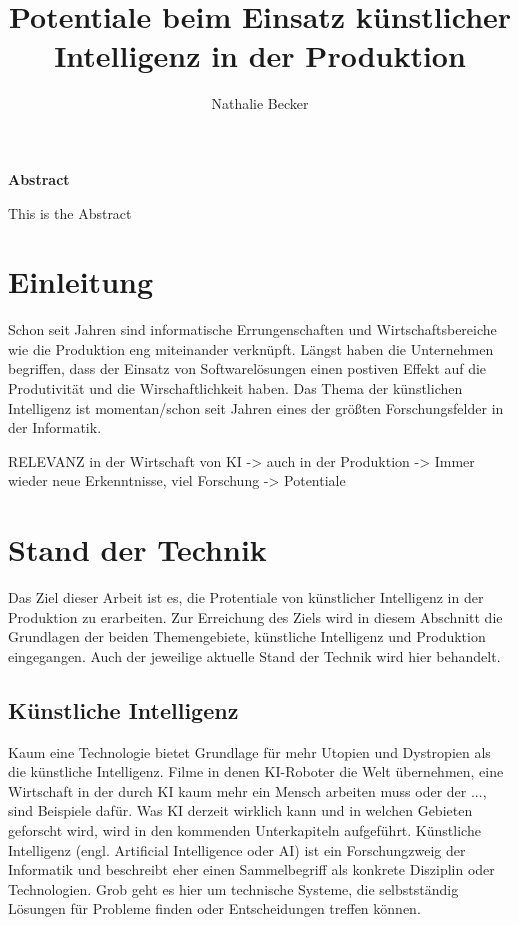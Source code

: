 \documentclass[a4paper,12pt, german]{report}
\begin{document}
\title{Potentiale beim Einsatz künstlicher Intelligenz in der Produktion}
\author{Nathalie Becker}


\begin{titlepage}
\maketitle
\end{titlepage}


\begin{center}
\textbf{Abstract}
\end{center}
This is the Abstract


\tableofcontents
\printacronyms

\chapter{Einleitung}

Schon seit Jahren sind informatische Errungenschaften und Wirtschaftsbereiche wie die Produktion eng miteinander verknüpft. Längst haben die Unternehmen begriffen, dass der Einsatz von Softwarelösungen einen postiven Effekt auf die Produtivität und die Wirschaftlichkeit haben.
Das Thema der künstlichen Intelligenz ist momentan/schon seit Jahren eines der größten Forschungsfelder in der Informatik. 

RELEVANZ in der Wirtschaft von KI -> auch in der Produktion -> Immer wieder neue Erkenntnisse, viel Forschung -> Potentiale 


\chapter{Stand der Technik}

Das Ziel dieser Arbeit ist es, die Protentiale von künstlicher Intelligenz in der Produktion zu erarbeiten. Zur Erreichung des Ziels wird in diesem Abschnitt die Grundlagen der beiden Themengebiete, künstliche Intelligenz und Produktion eingegangen. Auch der jeweilige aktuelle Stand der Technik wird hier behandelt.

\section{Künstliche Intelligenz}

Kaum eine Technologie bietet Grundlage für mehr Utopien und Dystropien als die künstliche Intelligenz. Filme in denen KI-Roboter die Welt übernehmen, eine Wirtschaft in der durch KI kaum mehr ein Mensch arbeiten muss oder der ..., sind Beispiele dafür. Was KI derzeit wirklich kann und in welchen Gebieten geforscht wird, wird in den kommenden Unterkapiteln aufgeführt.
Künstliche Intelligenz (engl. Artificial Intelligence oder AI) ist ein Forschungzweig der Informatik und beschreibt eher einen Sammelbegriff als konkrete Disziplin oder Technologien. Grob geht es hier um technische Systeme, die selbstständig Lösungen für Probleme finden oder Entscheidungen treffen können. \cite{01} %
\end{document}
